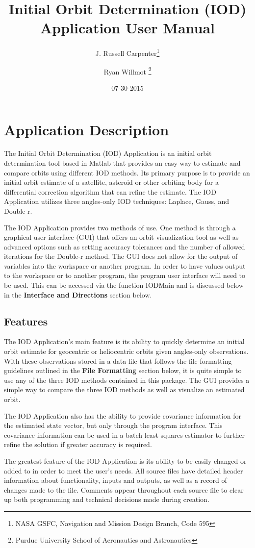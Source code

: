 \documentclass{article}
\title{Initial Orbit Determination (IOD) Application User Manual }
\author{J. Russell Carpenter\thanks{NASA GSFC, Navigation and Mission Design Branch, Code 595} \and Ryan Willmot \thanks{Purdue University School of Aeronautics and Astronautics} }
\date{07-30-2015}
\begin{document}
	\maketitle
	\newpage
	\tableofcontents
	\newpage

	\section{Application Description}
		\hspace{0.45 cm} The Initial Orbit Determination (IOD) Application is an initial orbit determination tool based in Matlab that provides an easy way to estimate and compare
                     orbits using different IOD methods. Its primary purpose is to provide an initial orbit estimate of a satellite, asteroid or other orbiting body for a 
                     differential correction algorithm that can refine the estimate. The IOD Application utilizes three angles-only IOD techniques: Laplace, Gauss, and Double-r. \par
		The IOD Application provides two methods of use. One method is through a graphical user interface (GUI) that offers an orbit visualization tool as well as advanced options
		such as setting accuracy tolerances and the number of allowed iterations for the Double-r method. The GUI does not allow for the output of variables into the workspace or 
		another program. In order to have values output to the workspace or to another program, the program user interface will need to be used. This can be accessed via the function
		IODMain and is discussed below in the \textbf{Interface and Directions} section below.\par
		
		\subsection{Features}
		\hspace{0.45 cm}The IOD Application's main feature is its ability to quickly determine an initial orbit estimate for geocentric or heliocentric orbits given angles-only observations. With these
		observations stored in a data file that follows the file-formatting guidelines outlined in the \textbf{File Formatting} section below, it is quite simple to use any of the three IOD 	
		methods contained in this package. The GUI provides a simple way to compare the three IOD methods as well as visualize an estimated orbit.\par
		The IOD Application also has the ability to provide covariance information for the estimated state vector, but only through the program interface.  This covariance information can 	
		be used in a batch-least squares estimator to further refine the solution if greater accuracy is required.\par
		The greatest feature of the IOD Application is its ability to be easily changed or added to in order to meet the user's needs. All source files have detailed header information
		about functionality, inputs and outputs, as well as a record of changes made to the file. Comments appear throughout each source file to clear up both programming and technical 
		decisions made during creation. \par
\end{document}

